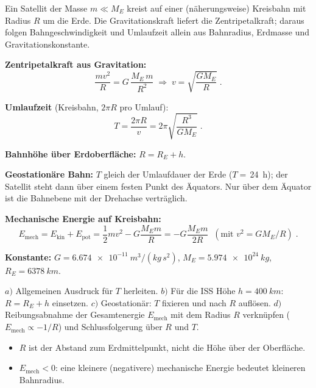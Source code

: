
Ein Satellit der Masse $m\ll M_E$ kreist auf einer (näherungsweise)
Kreisbahn mit Radius $R$ um die Erde. Die Gravitationskraft liefert die
Zentripetalkraft; daraus folgen Bahngeschwindigkeit und Umlaufzeit allein aus
Bahnradius, Erdmasse und Gravitationskonstante.

\begin{werkzeugkasten}[Werkzeuge]
\textbf{Zentripetalkraft aus Gravitation:}
\begin{equation}
  \frac{m v^2}{R} = G\,\frac{M_E\,m}{R^2}
  \;\Rightarrow\;
  v = \sqrt{\frac{G M_E}{R}}\;.
\end{equation}

\textbf{Umlaufzeit} (Kreisbahn, $2\pi R$ pro Umlauf):
\begin{equation}
  T = \frac{2\pi R}{v} = 2\pi\sqrt{\frac{R^3}{G M_E}}\;.
\end{equation}

\textbf{Bahnhöhe über Erdoberfläche:} $R = R_E + h$.

\textbf{Geostationäre Bahn:} $T$ gleich der Umlaufdauer der Erde
($T=$\,\unit{24 h}); der Satellit steht dann über einem festen Punkt des
Äquators. Nur über dem Äquator ist die Bahnebene mit der
Drehachse verträglich.

\textbf{Mechanische Energie auf Kreisbahn:}
\begin{equation}
  E_\mathrm{mech} = E_\mathrm{kin}+E_\mathrm{pot}
  = \frac12 m v^2 - G\frac{M_E m}{R}
  = -G\frac{M_E m}{2R}\;\;(\text{mit } v^2=GM_E/R)\;.
\end{equation}

\textbf{Konstante:} $G=\qty{6.674e-11}{m^3/(kg\,s^2)}$,
$M_E=\qty{5.974e24}{kg}$, $R_E=\qty{6378}{km}$.
\end{werkzeugkasten}

\begin{werkzeugkasten}
$a)$ Allgemeinen Ausdruck für $T$ herleiten. $b)$ Für die ISS Höhe
$h=\qty{400}{km}$: $R=R_E+h$ einsetzen. $c)$ Geostationär: $T$ fixieren und
nach $R$ auflösen. $d)$ Reibungsabnahme der Gesamtenergie $E_\mathrm{mech}$
mit dem Radius $R$ verknüpfen ($E_\mathrm{mech}\propto -1/R$) und
Schlussfolgerung über $R$ und $T$.
\end{werkzeugkasten}

\begin{achtung}
\begin{itemize}
  \item $R$ ist der Abstand zum Erdmittelpunkt, nicht die Höhe über der
       Oberfläche.
  \item $E_\mathrm{mech}<0$: eine kleinere (negativere) mechanische Energie
       bedeutet kleineren Bahnradius.
\end{itemize}
\end{achtung}
